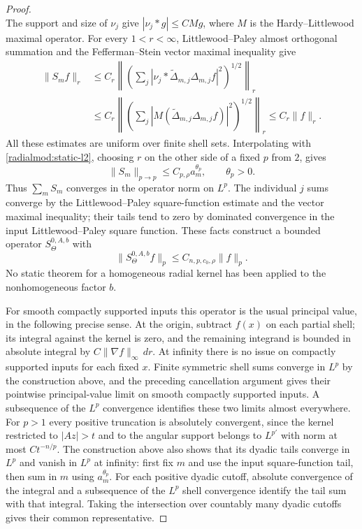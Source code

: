 \documentclass[11pt]{article}
\numberwithin{equation}{section}
\theoremstyle{remark}
\theoremstyle{definition}
\begin{document}
\begin{proof}
\begin{equation}
\end{equation}
The support and size of $\nu_j$ give
$|\nu_j*g|\le C M g$, where $M$ is the Hardy--Littlewood maximal
operator. For every $1<r<\infty$, Littlewood--Paley almost orthogonal
summation and the Fefferman--Stein vector maximal inequality give
\begin{align*}
 \|S_mf\|_r
 &\le C_r\left\|\left(\sum_j|\nu_j*\widetilde\Delta_{m,j}\Delta_{m,j}f|^2\right)^{1/2}\right\|_r\\
 &\le C_r\left\|\left(\sum_j|M(\widetilde\Delta_{m,j}\Delta_{m,j}f)|^2\right)^{1/2}\right\|_r
 \le C_r\|f\|_r.
\end{align*}
All these estimates are uniform over finite shell sets. Interpolating
with \eqref{radialmod:static-l2}, choosing $r$ on the other side of a
fixed $p$ from $2$, gives
\[
 \|S_m\|_{p\to p}\le C_{p,\rho}a_m^{\theta_p},\qquad\theta_p>0.
\]
Thus $\sum_mS_m$ converges in the operator norm on $L^p$. The individual
$j$ sums converge by the Littlewood--Paley square-function estimate and
the vector maximal inequality; their tails tend to zero by dominated
convergence in the input Littlewood--Paley square function. These facts
construct a bounded operator $S^{0,A,b}_\Theta$ with
\begin{equation}\label{radialmod:static-bound}
 \|S^{0,A,b}_\Theta f\|_p\le C_{n,p,c_0,\rho}\|f\|_p.
\end{equation}
No static theorem for a homogeneous radial kernel has been applied to
the nonhomogeneous factor $b$.

For smooth compactly supported inputs this operator is the usual
principal value, in the following precise sense. At the origin, subtract $f(x)$ on each partial shell;
its integral against the kernel is zero, and the remaining integrand is
bounded in absolute integral by $C\|\nabla f\|_\infty\,dr$. At infinity
there is no issue on compactly supported inputs for each fixed $x$.
Finite symmetric shell sums converge in $L^p$ by the construction
above, and the preceding cancellation argument gives their pointwise
principal-value limit on smooth compactly supported inputs. A subsequence
of the $L^p$ convergence identifies these two limits almost everywhere.
For $p>1$ every positive truncation is absolutely convergent, since the
kernel restricted to $|Az|>t$ and to the angular support belongs to
$L^{p'}$ with norm at most $C t^{-n/p}$. The construction above also
shows that its dyadic tails converge in $L^p$ and vanish in $L^p$ at
infinity: first fix $m$ and use the input square-function tail, then sum
in $m$ using $a_m^{\theta_p}$. For each positive dyadic cutoff,
absolute convergence of the integral and a subsequence of the $L^p$
shell convergence identify the tail sum with that integral. Taking the
intersection over countably many dyadic cutoffs gives their common
representative.
\end{proof}
\end{document}
